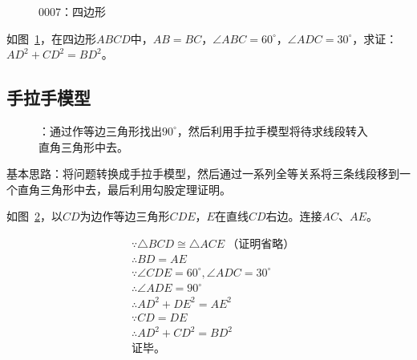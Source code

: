 

\begin{figure}[htbp]
  \centering
  \caption{0007：四边形} \label{fig:0007}
\end{figure}

如图~\ref{fig:0007}，在四边形$ABCD$中，$AB = BC$，$\angle ABC = 60^\circ$，$\angle ADC = 30^\circ$，求证：$AD^2 + CD^2 = BD^2$。

\subsection{手拉手模型} \label{subsec:0007-hand}

\begin{figure}[htbp]
  \centering
  \caption{：通过作等边三角形找出$90^\circ$，然后利用手拉手模型将待求线段转入直角三角形中去。}
  \label{fig:0007-hand}
\end{figure}

基本思路：将问题转换成手拉手模型，然后通过一系列全等关系将三条线段移到一个直角三角形中去，最后利用勾股定理证明。

如图~\ref{fig:0007-hand}，以$CD$为边作等边三角形$CDE$，$E$在直线$CD$右边。连接$AC$、$AE$。

\begin{align*}
  &\because   \triangle BCD \cong \triangle ACE \ \text{（证明省略）} \\
  &\therefore BD = AE \\
  &\because   \angle CDE = 60^\circ, \angle ADC = 30^\circ \\
  &\therefore \angle ADE = 90^\circ \\
  &\therefore AD^2 + DE^2 = AE^2 \\
  &\because   CD = DE \\
  &\therefore AD^2 + CD^2 = BD^2 \\
  &\text{证毕。} \\
\end{align*}
